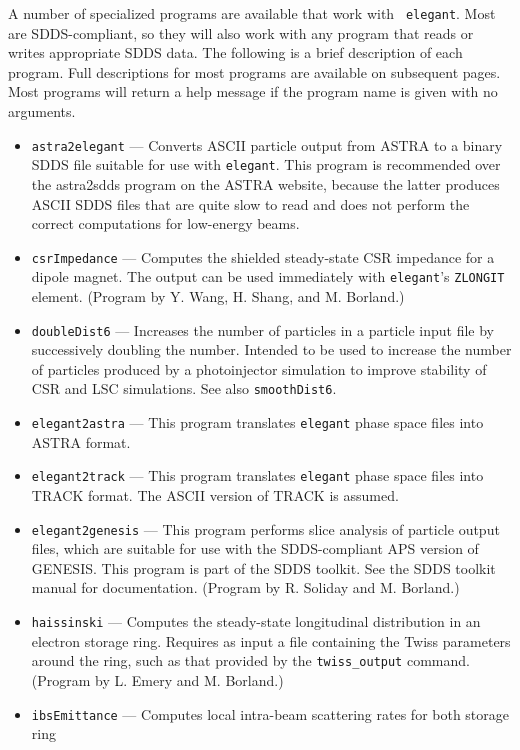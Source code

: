 \documentclass[11pt]{article}
\begin{document}
A number of specialized programs are available that work with {\tt
elegant}. Most are SDDS-compliant, so they will also work with any
program that reads or writes appropriate SDDS data.  The following is
a brief description of each program.  Full descriptions for most programs are available
on subsequent pages.  Most programs will return a help message if the program name is
given with no arguments.
\begin{itemize}
\item {\tt astra2elegant} --- Converts ASCII particle output from ASTRA \cite{ASTRA} to a binary
  SDDS file suitable for use with {\tt elegant}.  This program is recommended over
  the astra2sdds program on the ASTRA website, because the latter produces ASCII SDDS
  files that are quite slow to read and does not perform the correct computations
  for low-energy beams.
\item {\tt csrImpedance} --- Computes the shielded steady-state CSR impedance for a dipole magnet.
 The output can be used immediately with {\tt elegant}'s \verb|ZLONGIT| element.
 (Program by Y. Wang, H. Shang, and M. Borland.)
\item {\tt doubleDist6} --- Increases the number of particles in a particle input file by
 successively doubling the number.  Intended to be used to increase the number of particles
 produced by a photoinjector simulation to improve stability of CSR and LSC simulations.
 See also {\tt smoothDist6}.
\item {\tt elegant2astra} --- This program translates {\tt elegant} phase space files into ASTRA \cite{ASTRA} format.
\item {\tt elegant2track} --- This program translates {\tt elegant} phase space files into TRACK \cite{TRACK} format.
  The ASCII version of TRACK is assumed.
\item {\tt elegant2genesis} --- This program performs
        slice analysis of particle output files, which are suitable for use with
        the SDDS-compliant APS version of GENESIS\cite{GENESIS}.  This program is
        part of the SDDS toolkit.  See the SDDS toolkit
        manual for documentation. (Program by R. Soliday and M. Borland.)
\item {\tt haissinski} --- Computes the steady-state longitudinal distribution in
        an electron storage ring.  Requires as input a file containing the Twiss
        parameters around the ring, such as that provided by the \verb|twiss_output| command.
        (Program by L. Emery and M. Borland.)
\item {\tt ibsEmittance} --- Computes local intra-beam scattering rates for both storage ring

\end{itemize}
\end{document}

